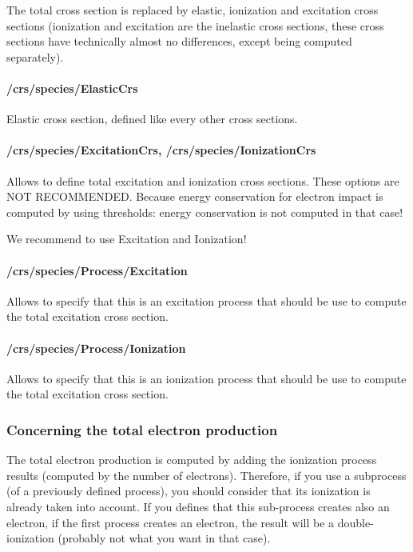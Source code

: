 The total cross section is replaced by elastic, ionization and excitation cross sections (ionization and excitation are the inelastic cross sections, these cross sections have technically almost no differences, except being computed separately).

\paragraph{/crs/species/ElasticCrs}
Elastic cross section, defined like every other cross sections.



\paragraph{/crs/species/ExcitationCrs, /crs/species/IonizationCrs}
Allows to define total excitation and ionization cross sections.
These options are NOT RECOMMENDED. Because energy conservation for electron impact is computed by using thresholds: energy conservation is not computed in that case!

We recommend to use Excitation and Ionization!

\paragraph{/crs/species/Process/Excitation}
Allows to specify that this is an excitation process that should be use to compute the total excitation cross section. 

\paragraph{/crs/species/Process/Ionization}
Allows to specify that this is an ionization process that should be use to compute the total excitation cross section. 
\subsubsection{Concerning the total electron production}
The total electron production is computed by adding the ionization process results (computed by the number of electrons).
Therefore, if you use a subprocess (of a previously defined process), you should consider that its ionization is already taken into account.
If you defines that this sub-process creates also an electron, if the first process creates an electron, the result will be a double-ionization (probably not what you want in that case).

